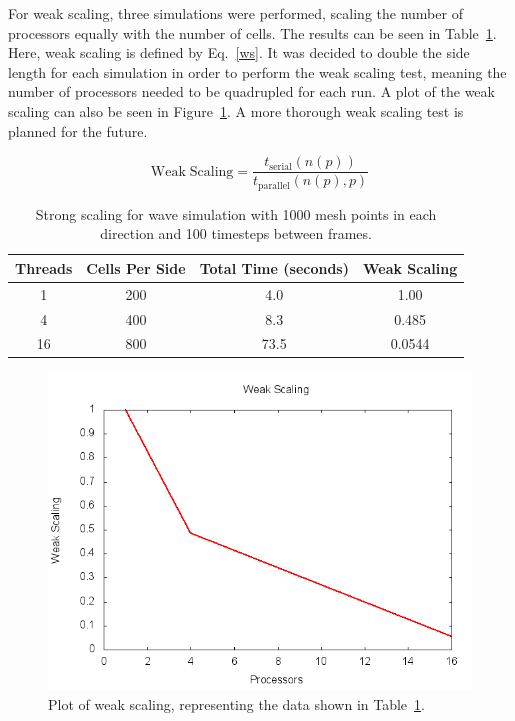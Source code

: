 \documentclass[12pt]{article}
\begin{document}
For weak scaling, three simulations were performed, scaling the number of processors equally with the number of cells. The results can be seen in Table~\ref{wstable}. Here, weak scaling is defined by Eq.~\ref{ws}. It was decided to double the side length for each simulation in order to perform the weak scaling test, meaning the number of processors needed to be quadrupled for each run. A plot of the weak scaling can also be seen in Figure~\ref{wsplot}. A more thorough weak scaling test is planned for the future.

\begin{equation}
\mathrm{Weak \; Scaling} = \frac{t_{\mathrm{serial}}(n(p))}{t_{\mathrm{parallel}}(n(p),p)}
\label{ws}
\end{equation}

\begin{table}[h]
	\begin{center}
		\begin{tabular}{|c c c c|}
			\hline
			Threads & Cells Per Side & Total Time (seconds) & Weak Scaling \\ \hline
			1 & 200 & 4.0 & 1.00   \\ \hline
			4 & 400 & 8.3 & 0.485 \\ \hline
			16 & 800 & 73.5 & 0.0544   \\ \hline
		\end{tabular}
		\caption{Strong scaling for wave simulation with 1000 mesh points in each direction and 100 timesteps between frames.}
		\label{wstable}
	\end{center}
\end{table}

		\begin{figure}[h]
			\begin{center}
				\includegraphics[width=0.6\columnwidth]{wsplot}
				\caption{Plot of weak scaling, representing the data shown in Table~\ref{wstable}.}
				\label{wsplot}
			\end{center}
		\end{figure}
\end{document}
